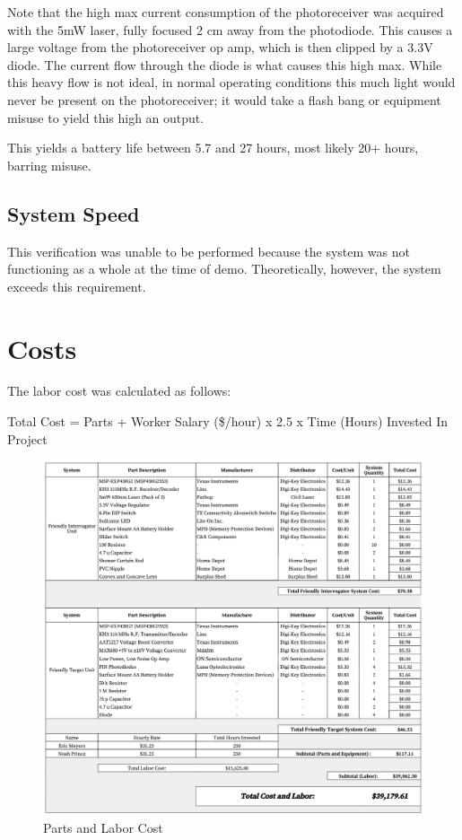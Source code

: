 \documentclass[letterpaper,10pt]{article}
\begin{document}
\begin{spacing}{1.15}
Note that the high max current consumption of the photoreceiver was acquired with the 5mW laser, fully focused 2 cm away from the photodiode. This causes a large voltage from the photoreceiver op amp, which is then clipped by a 3.3V diode. The current flow through the diode is what causes this high max. While this heavy flow is not ideal, in normal operating conditions this much light would never be present on the photoreceiver; it would take a flash bang or equipment misuse to yield this high an output. 

This yields a battery life between 5.7 and 27 hours, most likely 20+ hours, barring misuse. 

\subsection{System Speed}

This verification was unable to be performed because the system was not functioning as a whole at the time of demo. Theoretically, however, the system exceeds this requirement. 

\section{Costs}

The labor cost was calculated as follows:

\begin{center}
	Total Cost = Parts + Worker Salary (\$/hour) x 2.5 x Time (Hours) Invested In Project
\end{center}

\begin{figure} [H]
	\centering
	\includegraphics[scale=0.60]{parts-labor-cost.png}
	\caption{Parts and Labor Cost\label{fig:parts-labor-cost}}
\end{figure}




\end{spacing}
\end{document}
